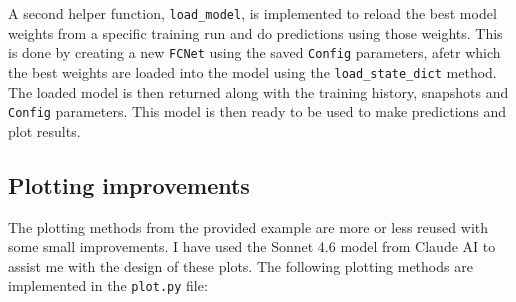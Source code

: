 \documentclass[we,twoside,openright,a4paper,11pt]{uantwerpenbamathesis}
\begin{document}
A second helper function, \verb|load_model|, is implemented to reload the best model weights from a specific training run and do predictions using those weights. This is done by creating a new \verb|FCNet| using the saved \verb|Config| parameters, afetr which the best weights are loaded into the model using the \verb|load_state_dict| method. The loaded model is then returned along with the training history, snapshots and \verb|Config| parameters. This model is then ready to be used to make predictions and plot results.

\subsection{Plotting improvements}
The plotting methods from the provided example are more or less reused with some small improvements. I have used the Sonnet 4.6 model from Claude AI to assist me with the design of these plots. The following plotting methods are implemented in the \verb|plot.py| file:
\end{document}
